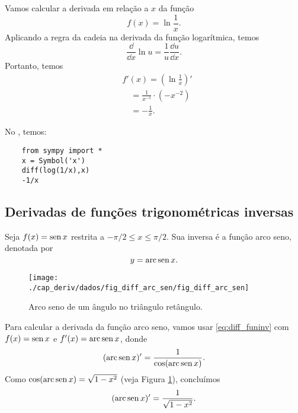 \begin{ex}
  Vamos calcular a derivada em relação a $x$ da função
  \begin{equation}
    f(x) = \ln \frac{1}{x}.
  \end{equation}
  Aplicando a regra da cadeia na derivada da função logarítmica, temos
  \begin{equation}
    \frac{\dd}{\dd x}\ln u = \frac{1}{u}\frac{\dd u}{\dd x}.
  \end{equation}
  Portanto, temos
  \begin{align}
    & f'(x) = \left(\ln\frac{1}{x}\right)'\\
    & \text{}\quad = \frac{1}{x^{-1}}\cdot (-x^{-2}) \\
    & \text{}\quad = -\frac{1}{x}.
  \end{align}

  \ifispython
  No \sympy, temos:
  \begin{lstlisting}
    from sympy import *
    x = Symbol('x')
    diff(log(1/x),x)
    -1/x
  \end{lstlisting}
  \fi  
\end{ex}

\subsection{Derivadas de funções trigonométricas inversas}

Seja $f(x) = \operatorname{sen} x$ restrita a $-\pi/2 \leq x \leq \pi/2$. Sua inversa é a função arco seno, denotada por
\begin{equation}
  y = \operatorname{arc}\operatorname{sen} x.
\end{equation}

\begin{figure}[H]
  \centering
  \texttt{[image: ./cap\_deriv/dados/fig\_diff\_arc\_sen/fig\_diff\_arc\_sen]}
  \caption{Arco seno de um ângulo no triângulo retângulo.}
  \label{fig:diff_arc_sen}
\end{figure}

Para calcular a derivada da função arco seno, vamos usar \eqref{eq:diff_funinv} com $f(x)=\operatorname{sen} x$ e $f'(x) = \operatorname{arc}\operatorname{sen} x$, donde
\begin{equation}
  (\operatorname{arc}\operatorname{sen} x)' = \frac{1}{\cos(\operatorname{arc}\operatorname{sen} x)}.
\end{equation}
Como $\cos(\operatorname{arc}\operatorname{sen} x) = \sqrt{1-x^2}$ (veja Figura \ref{fig:diff_arc_sen}), concluímos
\begin{equation}
  (\operatorname{arc}\operatorname{sen} x)' = \frac{1}{\sqrt{1-x^2}}.
\end{equation}


